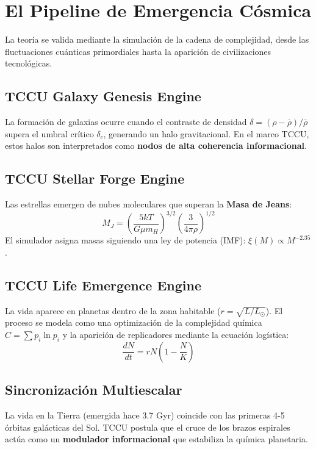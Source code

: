 \chapter{El Pipeline de Emergencia Cósmica}
La teoría se valida mediante la simulación de la cadena de complejidad, desde las fluctuaciones cuánticas primordiales hasta la aparición de civilizaciones tecnológicas.

\section{TCCU Galaxy Genesis Engine}
La formación de galaxias ocurre cuando el contraste de densidad $\delta = (\rho - \bar{\rho})/\bar{\rho}$ supera el umbral crítico $\delta_c$, generando un halo gravitacional. En el marco TCCU, estos halos son interpretados como \textbf{nodos de alta coherencia informacional}.

\section{TCCU Stellar Forge Engine}
Las estrellas emergen de nubes moleculares que superan la \textbf{Masa de Jeans}:
\begin{equation}
M_J = \left(\frac{5kT}{G\mu m_H}\right)^{3/2} \left(\frac{3}{4\pi\rho}\right)^{1/2}
\end{equation}
El simulador asigna masas siguiendo una ley de potencia (IMF): $\xi(M) \propto M^{-2.35}$.

\section{TCCU Life Emergence Engine}
La vida aparece en planetas dentro de la zona habitable ($r = \sqrt{L/L_\odot}$). El proceso se modela como una optimización de la complejidad química $C = \sum p_i \ln p_i$ y la aparición de replicadores mediante la ecuación logística:
\begin{equation}
\frac{dN}{dt} = rN \left(1 - \frac{N}{K}\right)
\end{equation}

\section{Sincronización Multiescalar}
La vida en la Tierra (emergida hace 3.7 Gyr) coincide con las primeras 4-5 órbitas galácticas del Sol. TCCU postula que el cruce de los brazos espirales actúa como un \textbf{modulador informacional} que estabiliza la química planetaria.
